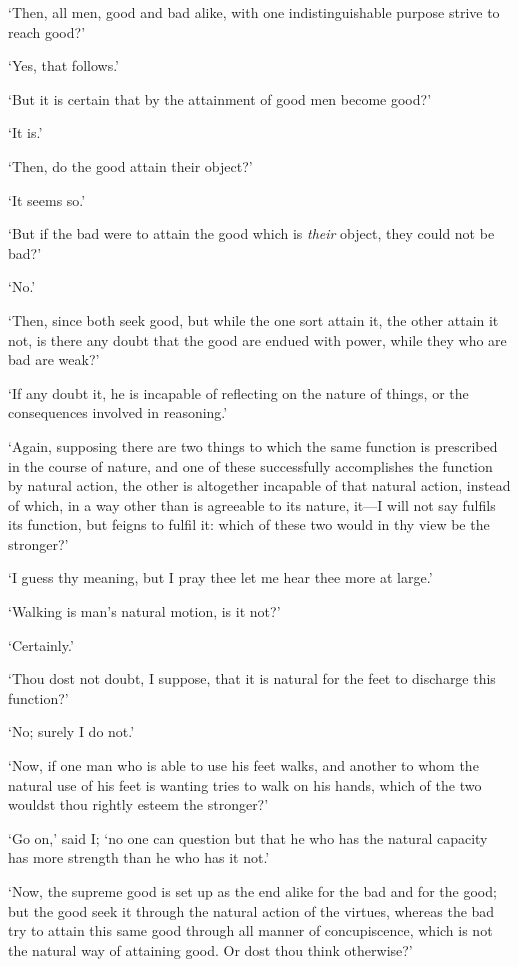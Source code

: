 \documentclass[12pt]{book}
\begin{document}
`Then, all men, good and bad alike, with one indistinguishable purpose
strive to reach good?'

`Yes, that follows.'

`But it is certain that by the attainment of good men become good?'

`It is.'

`Then, do the good attain their object?'

`It seems so.'

`But if the bad were to attain the good which is \emph{their} object, they
could not be bad?'

`No.'

`Then, since both seek good, but while the one sort attain it, the other
attain it not, is there any doubt that the good are endued with power,
while they who are bad are weak?'

`If any doubt it, he is incapable of reflecting on the nature of things,
or the consequences involved in reasoning.'

`Again, supposing there are two things to which the same function is
prescribed in the course of nature, and one of these successfully
accomplishes the function by natural action, the other is altogether
incapable of that natural action, instead of which, in a way other than
is agreeable to its nature, it---I will not say fulfils its function, but
feigns to fulfil it: which of these two would in thy view be the
stronger?'

`I guess thy meaning, but I pray thee let me hear thee more at large.'

`Walking is man's natural motion, is it not?'

`Certainly.'

`Thou dost not doubt, I suppose, that it is natural for the feet to
discharge this function?'

`No; surely I do not.'

`Now, if one man who is able to use his feet walks, and another to whom
the natural use of his feet is wanting tries to walk on his hands,
which of the two wouldst thou rightly esteem the stronger?'

`Go on,' said I; `no one can question but that he who has the natural
capacity has more strength than he who has it not.'

`Now, the supreme good is set up as the end alike for the bad and for
the good; but the good seek it through the natural action of the
virtues, whereas the bad try to attain this same good through all manner
of concupiscence, which is not the natural way of attaining good. Or
dost thou think otherwise?'
\end{document}
